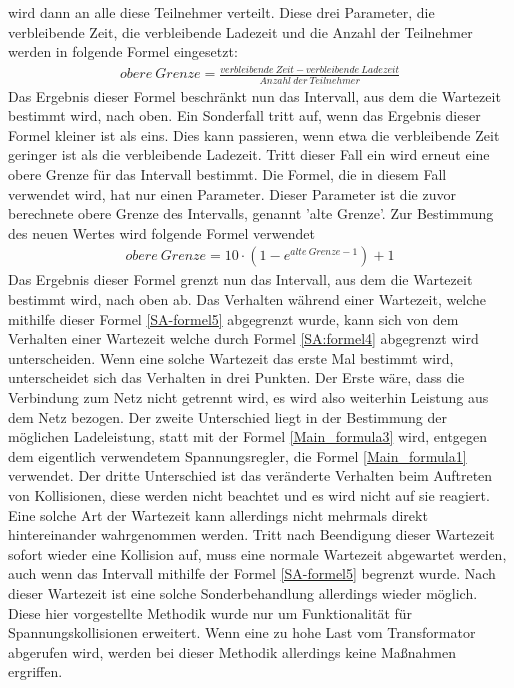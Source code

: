 wird dann an alle diese Teilnehmer verteilt. Diese drei Parameter, die verbleibende Zeit, die verbleibende Ladezeit und die Anzahl der Teilnehmer werden in folgende Formel eingesetzt:
\begin{align}
	obere \ Grenze = \frac{verbleibende\ Zeit - verbleibende\ Ladezeit}{Anzahl\ der\ Teilnehmer}
	\label{SA:formel4}
\end{align}
Das Ergebnis dieser Formel beschränkt nun das Intervall, aus dem die Wartezeit bestimmt wird, nach oben. Ein Sonderfall tritt auf, wenn das Ergebnis dieser Formel kleiner ist als eins. Dies kann passieren, wenn etwa die verbleibende Zeit geringer ist als die verbleibende Ladezeit. Tritt dieser Fall ein wird erneut eine obere Grenze für das Intervall bestimmt. Die Formel, die in diesem Fall verwendet wird, hat nur einen Parameter. Dieser Parameter ist die zuvor berechnete obere Grenze des Intervalls, genannt 'alte Grenze'. Zur Bestimmung des neuen Wertes wird folgende Formel verwendet
\begin{align}
	obere\ Grenze = 10 \cdot (1 - e^{alte\ Grenze - 1}) + 1
	\label{SA-formel5}
\end{align}
Das Ergebnis dieser Formel grenzt nun das Intervall, aus dem die Wartezeit bestimmt wird, nach oben ab. Das Verhalten während einer Wartezeit, welche mithilfe dieser Formel \ref{SA-formel5} abgegrenzt wurde, kann sich von dem Verhalten einer Wartezeit welche durch Formel \ref{SA:formel4} abgegrenzt wird unterscheiden. Wenn eine solche Wartezeit das erste Mal bestimmt wird, unterscheidet sich das Verhalten in drei Punkten. Der Erste wäre, dass die Verbindung zum Netz nicht getrennt wird, es wird also weiterhin Leistung aus dem Netz bezogen. Der zweite Unterschied liegt in der Bestimmung der möglichen Ladeleistung, statt mit der Formel \ref{Main_formula3} wird, entgegen dem eigentlich verwendetem Spannungsregler, die Formel \ref{Main_formula1} verwendet. Der dritte Unterschied ist das veränderte Verhalten beim Auftreten von Kollisionen, diese werden nicht beachtet und es wird nicht auf sie reagiert. Eine solche Art der Wartezeit kann allerdings nicht mehrmals direkt hintereinander wahrgenommen werden. Tritt nach Beendigung dieser Wartezeit sofort wieder eine Kollision auf, muss eine normale Wartezeit abgewartet werden, auch wenn das Intervall mithilfe der Formel \ref{SA-formel5} begrenzt wurde. Nach dieser Wartezeit ist eine solche Sonderbehandlung allerdings wieder möglich. Diese hier vorgestellte Methodik wurde nur um Funktionalität für Spannungskollisionen erweitert. Wenn eine zu hohe Last vom Transformator abgerufen wird, werden bei dieser Methodik allerdings keine Maßnahmen ergriffen.
